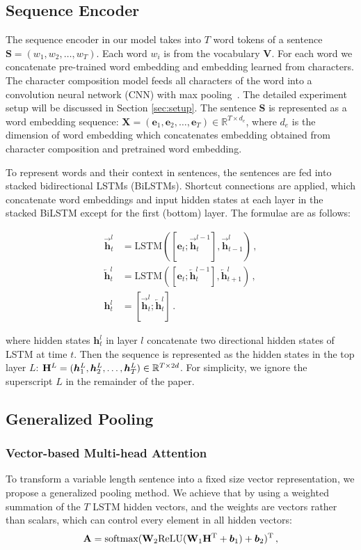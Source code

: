 \documentclass[11pt]{article}
\newcommand{\vect}[1]{\bm{#1}}
\newcommand{\mat}[1]{\bf{#1}}
\newcommand{\RR}{\mathbb{R}}
\begin{document}
\subsection{Sequence Encoder}


The sequence encoder in our model takes into $T$ word tokens of a sentence ${\vect S} = (w_1, w_2, \dots, w_T)$. Each word $w_i$ is from the vocabulary ${\vect V}$. For each word we concatenate pre-trained word embedding and embedding learned from characters. The character composition model feeds all characters of the word into a convolution neural network (CNN) with max pooling~\cite{DBLP:conf/emnlp/Kim14}. The detailed experiment setup will be discussed in Section \ref{sec:setup}. The sentence ${\vect S}$ is represented as a word embedding sequence: ${\vect X} = ({\vect e}_1, {\vect e}_2, \dots, {\vect e}_T) \in \RR^{T \times d_e}$, where $d_e$ is the dimension of word embedding which concatenates embedding obtained from character composition and pretrained word embedding.

To represent words and their context in sentences, the sentences are fed into stacked bidirectional LSTMs (BiLSTMs). Shortcut connections are applied, which concatenate word embeddings and input hidden states at each layer in the stacked BiLSTM except for the first (bottom) layer. The formulae are as follows:

\begin{align}
\overrightarrow{\vect h}^l_t &= \text{LSTM}([{\vect e}_t;\overrightarrow{\vect h}^{l-1}_t], \overrightarrow{\vect h}_{t-1}^l) \,,\\
\overleftarrow{\vect h}^l_t &= \text{LSTM}([{\vect e}_t;\overleftarrow{\vect h}^{l-1}_t], \overleftarrow{\vect h}_{t+1}^l) \,,\\
{\vect h}_t^l &= [\overrightarrow{\vect h}_t^l;\overleftarrow{\vect h}_t^l]\,.
\end{align}

\noindent where hidden states ${\vect h}_t^l$ in layer $l$ concatenate two directional hidden states of LSTM at time $t$.
Then the sequence is represented as the hidden states in the top layer $L$: ${\mat H}^{L} = ({\vect h}_1^L, {\vect h}_2^L,\dots, {\vect h}_T^L) \in \RR^{T \times 2d}$. For simplicity, we ignore the superscript $L$ in the remainder of the paper.

\subsection{Generalized Pooling}
\subsubsection{Vector-based Multi-head Attention} 
To transform a variable length sentence into a fixed size vector representation, we propose a generalized pooling method. We achieve that by using a weighted summation of the $T$ LSTM hidden vectors, and the weights are vectors rather than scalars, which can control every element in all hidden vectors: 
\begin{align}
{\mat A} = \text{softmax}({\mat W}_2\text{ReLU}({\mat W}_1 {\mat H}^\mathrm{T} + {\vect b_1} ) + {\vect b_2})^\mathrm{T} \,,
\end{align}
\end{document}
